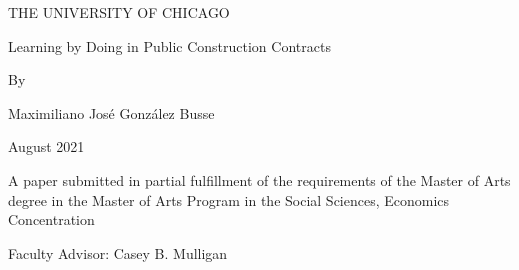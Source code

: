 \begin{titlepage}
   \begin{center}

  \vspace*{3cm}

{\LARGE THE UNIVERSITY OF CHICAGO}

\vspace*{1.5cm}

{\Huge Learning by Doing in Public Construction Contracts}

\vspace*{1.5cm}

{\LARGE By}

\vspace*{1.5cm}

{\Huge Maximiliano José González Busse}

\vspace*{1.5cm}

{\LARGE August 2021}

\vspace*{1.5cm}

{\large A paper submitted in partial fulfillment of the requirements of the Master of Arts degree in the Master of Arts Program in the Social Sciences, Economics Concentration}

\vspace*{2.5cm}
   \end{center}

{\large Faculty Advisor: Casey B. Mulligan}

\end{titlepage}
